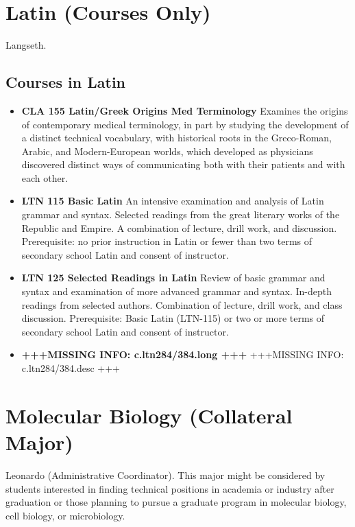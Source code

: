 \documentclass[
  letterpaper,
]{scrbook}
\providecommand{\tightlist}{%
  \setlength{\itemsep}{0pt}\setlength{\parskip}{0pt}}
\begin{document}
\hypertarget{sec-latin}{%
\section{Latin (Courses Only)}\label{sec-latin}}

Langseth.

\hypertarget{courses-in-latin}{%
\subsection{Courses in Latin}\label{courses-in-latin}}

\begin{itemize}
\tightlist
\item
  \textbf{CLA 155 Latin/Greek Origins Med Terminology} Examines the
  origins of contemporary medical terminology, in part by studying the
  development of a distinct technical vocabulary, with historical roots
  in the Greco-Roman, Arabic, and Modern-European worlds, which
  developed as physicians discovered distinct ways of communicating both
  with their patients and with each other.
\item
  \textbf{LTN 115 Basic Latin} An intensive examination and analysis of
  Latin grammar and syntax. Selected readings from the great literary
  works of the Republic and Empire. A combination of lecture, drill
  work, and discussion. Prerequisite: no prior instruction in Latin or
  fewer than two terms of secondary school Latin and consent of
  instructor.
\item
  \textbf{LTN 125 Selected Readings in Latin} Review of basic grammar
  and syntax and examination of more advanced grammar and syntax.
  In-depth readings from selected authors. Combination of lecture, drill
  work, and class discussion. Prerequisite: Basic Latin (LTN-115) or two
  or more terms of secondary school Latin and consent of instructor.
\item
  \textbf{+++MISSING INFO: c.ltn284/384.long +++} +++MISSING INFO:
  c.ltn284/384.desc +++
\end{itemize}

\hypertarget{sec-molecular-biology}{%
\section{Molecular Biology (Collateral
Major)}\label{sec-molecular-biology}}

Leonardo (Administrative Coordinator). This major might be considered by
students interested in finding technical positions in academia or
industry after graduation or those planning to pursue a graduate program
in molecular biology, cell biology, or microbiology.
\end{document}
